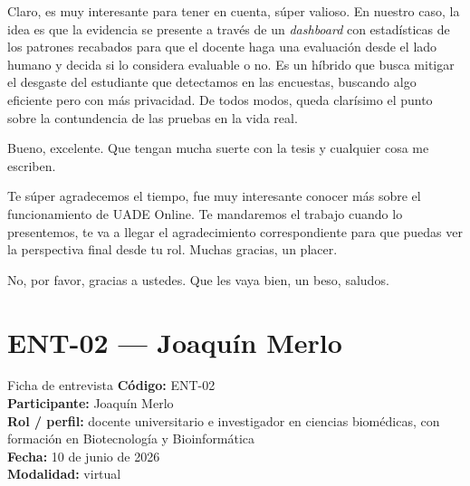 \begin{description}[leftmargin=0cm, labelsep=0.5cm, style=nextline]
\item[\textbf{Entrevistador:}] Claro, es muy interesante para tener en cuenta, súper valioso. En nuestro caso, la idea es que la evidencia se presente a través de un \textit{dashboard} con estadísticas de los patrones recabados para que el docente haga una evaluación desde el lado humano y decida si lo considera evaluable o no. Es un híbrido que busca mitigar el desgaste del estudiante que detectamos en las encuestas, buscando algo eficiente pero con más privacidad. De todos modos, queda clarísimo el punto sobre la contundencia de las pruebas en la vida real.
\item[\textbf{Entrevistado:}] Bueno, excelente. Que tengan mucha suerte con la tesis y cualquier cosa me escriben.
\item[\textbf{Entrevistador:}] Te súper agradecemos el tiempo, fue muy interesante conocer más sobre el funcionamiento de UADE Online. Te mandaremos el trabajo cuando lo presentemos, te va a llegar el agradecimiento correspondiente para que puedas ver la perspectiva final desde tu rol. Muchas gracias, un placer.
\item[\textbf{Entrevistado:}] No, por favor, gracias a ustedes. Que les vaya bien, un beso, saludos.
\end{description}

\section*{ENT-02 --- Joaquín Merlo}
\begin{ficha}{Ficha de entrevista}
\small
\textbf{Código:} ENT-02\\[2pt]
\textbf{Participante:} Joaquín Merlo\\[2pt]
\textbf{Rol / perfil:} docente universitario e investigador en ciencias biomédicas, con formación en Biotecnología y Bioinformática\\[2pt]
\textbf{Fecha:} 10 de junio de 2026\\[2pt]
\textbf{Modalidad:} virtual\\[2pt]
\end{ficha}
